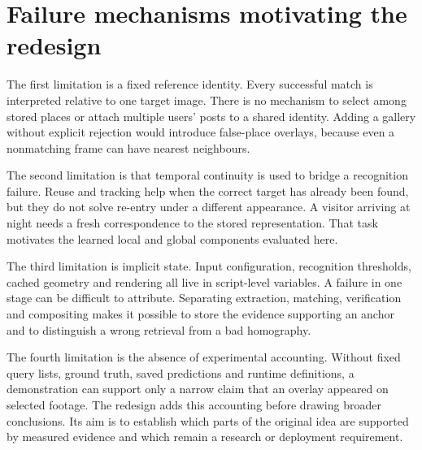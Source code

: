 \section{Failure mechanisms motivating the redesign}
The first limitation is a fixed reference identity. Every successful match is interpreted relative to one target image. There is no mechanism to select among stored places or attach multiple users' posts to a shared identity. Adding a gallery without explicit rejection would introduce false-place overlays, because even a nonmatching frame can have nearest neighbours.

The second limitation is that temporal continuity is used to bridge a recognition failure. Reuse and tracking help when the correct target has already been found, but they do not solve re-entry under a different appearance. A visitor arriving at night needs a fresh correspondence to the stored representation. That task motivates the learned local and global components evaluated here.

The third limitation is implicit state. Input configuration, recognition thresholds, cached geometry and rendering all live in script-level variables. A failure in one stage can be difficult to attribute. Separating extraction, matching, verification and compositing makes it possible to store the evidence supporting an anchor and to distinguish a wrong retrieval from a bad homography.

The fourth limitation is the absence of experimental accounting. Without fixed query lists, ground truth, saved predictions and runtime definitions, a demonstration can support only a narrow claim that an overlay appeared on selected footage. The redesign adds this accounting before drawing broader conclusions. Its aim is to establish which parts of the original idea are supported by measured evidence and which remain a research or deployment requirement.
